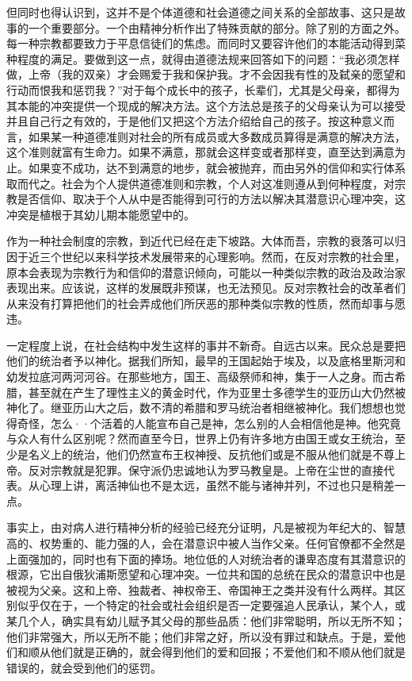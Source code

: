 \documentclass[UTF8,10pt,a4paper,openany]{book}
\begin{document}
但同时也得认识到，这并不是个体道德和社会道德之间关系的全部故事、这只是故事的一个重要部分。一个由精神分析作出了特殊贡献的部分。除了别的方面之外。每一种宗教都要致力于平息信徒们的焦虑。而同时又要容许他们的本能活动得到菜种程度的满足。要做到这一点，就得由道德法规来回答如下的问题：“我必须怎样做，上帝（我的双亲）才会赐爱于我和保护我。才不会因我有性的及弑亲的愿望和行动而恨我和惩罚我？”对于每个成长中的孩子，长辈们，尤其是父母亲，都得为其本能的冲突提供一个现成的解决方法。这个方法总是孩子的父母亲认为可以接受并且自己行之有效的，于是他们又把这个方法介绍给自己的孩子。按这种意义而言，如果某一种道德准则对社会的所有成员或大多数成员算得是满意的解决方法，这个准则就富有生命力。如果不满意，那就会这样变或者那样变，直至达到满意为止。如果变不成功，达不到满意的地步，就会被抛弃，而由另外的信仰和实行体系取而代之。社会为个人提供道德准则和宗教，个人对这准则遵从到何种程度，对宗教是否信仰、取决于个人从中是否能得到可行的方法以解决其潜意识心理冲突，这冲突是植根于其幼儿期本能愿望中的。

作为一种社会制度的宗教，到近代已经在走下坡路。大体而吾，宗教的衰落可以归因于近三个世纪以来科学技术发展带来的心理影响。然而，在反对宗教的社会里，原本会表现为宗教行为和信仰的潜意识倾向，可能以一种类似宗教的政治及政治家表现出来。应该说，这样的发展既非预谋，也无法预见。反对宗教社会的改革者们从来没有打算把他们的社会弄成他们所厌恶的那种类似宗教的性质，然而却事与愿违。

一定程度上说，在社会结构中发生这样的事并不新奇。自远古以来。民众总是要把他们的统治者予以神化。据我们所知，最早的王国起始于埃及，以及底格里斯河和幼发拉底河两河河谷。在那些地方，国王、高级祭师和神，集于一人之身。而古希腊，甚至就在产生了理性主义的黄金时代，作为亚里士多德学生的亚历山大仍然被神化了。继亚历山大之后，数不清的希腊和罗马统治者相继被神化。我们想想也觉得奇怪，怎么··个活着的人能宣布自己是神，怎么别的人会相信他是神。他究竟与众人有什么区别呢？然而直至今日，世界上仍有许多地方由国王或女王统治，至少是名义上的统治，他们仍然宣布王权神授、反抗他们或是不服从他们就是不尊上帝。反对宗教就是犯罪。保守派仍忠诚地认为罗马教皇是。上帝在尘世的直接代表。从心理上讲，离活神仙也不是太远，虽然不能与诸神并列，不过也只是稍差一点。

事实上，由对病人进行精神分析的经验已经充分证明，凡是被视为年纪大的、智慧高的、权势重的、能力强的人，会在潜意识中被人当作父亲。任何官僚都不全然是上面强加的，同时也有下面的捧场。地位低的人对统治者的谦卑态度有其潜意识的根源，它出自俄狄浦斯愿望和心理冲突。一位共和国的总统在民众的潜意识中也是被视为父亲。这和上帝、独裁者、神权帝王、帝国神王之类并没有什么两样。其区别似乎仅在于，一个特定的社会或社会组织是否一定要强追人民承认，某个人，或某几个人，确实具有幼儿赋予其父母的那些品质：他们非常聪明，所以无所不知；他们非常强大，所以无所不能；他们非常之好，所以没有罪过和缺点。于是，爱他们和顺从他们就是正确的，就会得到他们的爱和回报；不爱他们和不顺从他们就是错误的，就会受到他们的惩罚。
\end{document}
